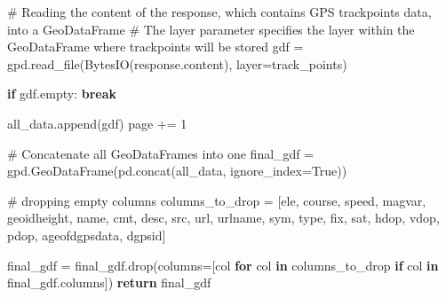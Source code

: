 \documentclass[
  letterpaper,
  DIV=11,
  numbers=noendperiod]{scrreprt}
\newenvironment{Shaded}{\begin{snugshade}}{\end{snugshade}}
\newcommand{\CommentTok}[1]{\textcolor[rgb]{0.37,0.37,0.37}{#1}}
\newcommand{\ControlFlowTok}[1]{\textcolor[rgb]{0.00,0.23,0.31}{\textbf{#1}}}
\newcommand{\DecValTok}[1]{\textcolor[rgb]{0.68,0.00,0.00}{#1}}
\newcommand{\KeywordTok}[1]{\textcolor[rgb]{0.00,0.23,0.31}{\textbf{#1}}}
\newcommand{\NormalTok}[1]{\textcolor[rgb]{0.00,0.23,0.31}{#1}}
\newcommand{\OperatorTok}[1]{\textcolor[rgb]{0.37,0.37,0.37}{#1}}
\newcommand{\StringTok}[1]{\textcolor[rgb]{0.13,0.47,0.30}{#1}}
\newcommand{\VariableTok}[1]{\textcolor[rgb]{0.07,0.07,0.07}{#1}}
\begin{document}
\begin{Shaded}
\begin{Highlighting}[]
        \CommentTok{\# Reading the content of the response, which contains GPS trackpoints data, into a GeoDataFrame}
        \CommentTok{\# The \textquotesingle{}layer\textquotesingle{} parameter specifies the layer within the GeoDataFrame where trackpoints will be stored}
\NormalTok{        gdf }\OperatorTok{=}\NormalTok{ gpd.read\_file(BytesIO(response.content), layer}\OperatorTok{=}\StringTok{\textquotesingle{}track\_points\textquotesingle{}}\NormalTok{)}

        \ControlFlowTok{if}\NormalTok{ gdf.empty:}
            \ControlFlowTok{break}
            
\NormalTok{        all\_data.append(gdf)}
\NormalTok{        page }\OperatorTok{+=} \DecValTok{1}
        
    \CommentTok{\# Concatenate all GeoDataFrames into one}
\NormalTok{    final\_gdf }\OperatorTok{=}\NormalTok{ gpd.GeoDataFrame(pd.concat(all\_data, ignore\_index}\OperatorTok{=}\VariableTok{True}\NormalTok{))}
    
    \CommentTok{\# dropping empty columns}
\NormalTok{    columns\_to\_drop }\OperatorTok{=}\NormalTok{ [}\StringTok{\textquotesingle{}ele\textquotesingle{}}\NormalTok{, }\StringTok{\textquotesingle{}course\textquotesingle{}}\NormalTok{, }\StringTok{\textquotesingle{}speed\textquotesingle{}}\NormalTok{, }\StringTok{\textquotesingle{}magvar\textquotesingle{}}\NormalTok{, }\StringTok{\textquotesingle{}geoidheight\textquotesingle{}}\NormalTok{, }\StringTok{\textquotesingle{}name\textquotesingle{}}\NormalTok{, }\StringTok{\textquotesingle{}cmt\textquotesingle{}}\NormalTok{, }\StringTok{\textquotesingle{}desc\textquotesingle{}}\NormalTok{,}
                       \StringTok{\textquotesingle{}src\textquotesingle{}}\NormalTok{, }\StringTok{\textquotesingle{}url\textquotesingle{}}\NormalTok{, }\StringTok{\textquotesingle{}urlname\textquotesingle{}}\NormalTok{, }\StringTok{\textquotesingle{}sym\textquotesingle{}}\NormalTok{, }\StringTok{\textquotesingle{}type\textquotesingle{}}\NormalTok{, }\StringTok{\textquotesingle{}fix\textquotesingle{}}\NormalTok{, }\StringTok{\textquotesingle{}sat\textquotesingle{}}\NormalTok{, }\StringTok{\textquotesingle{}hdop\textquotesingle{}}\NormalTok{, }\StringTok{\textquotesingle{}vdop\textquotesingle{}}\NormalTok{,}
                       \StringTok{\textquotesingle{}pdop\textquotesingle{}}\NormalTok{, }\StringTok{\textquotesingle{}ageofdgpsdata\textquotesingle{}}\NormalTok{, }\StringTok{\textquotesingle{}dgpsid\textquotesingle{}}\NormalTok{]}
    
\NormalTok{    final\_gdf }\OperatorTok{=}\NormalTok{ final\_gdf.drop(columns}\OperatorTok{=}\NormalTok{[col }\ControlFlowTok{for}\NormalTok{ col }\KeywordTok{in}\NormalTok{ columns\_to\_drop }\ControlFlowTok{if}\NormalTok{ col }\KeywordTok{in}\NormalTok{ final\_gdf.columns])}
    \ControlFlowTok{return}\NormalTok{ final\_gdf}
\end{Highlighting}
\end{Shaded}
\end{document}
